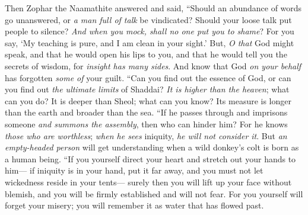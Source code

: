 \begin{biblechapter} %
 Then Zophar the Naamathite answered and said,
\verse “Should an abundance of words go unanswered, 
or \textit{a man full of talk} be vindicated?
\verse Should your loose talk put people to silence? 
\textit{And when you mock, shall no one put you to shame}?
\verse For you say, ‘My teaching is pure, 
and I am clean in your sight.’
\verse But, \textit{O that} God might speak, 
and that he would open his lips to you,
\verse and that he would tell you the secrets of wisdom, 
for \textit{insight has many sides}. 
And know that God \textit{on your behalf} has forgotten \textit{some of} your guilt.
\verse “Can you find out the essence of God, 
or can you find out \textit{the ultimate limits} of Shaddai?
\verse \textit{It is higher than the heaven}; what can you do? 
It is deeper than Sheol; what can you know?
\verse Its measure is longer than the earth 
and broader than the sea.
\verse “If he passes through and imprisons someone 
\textit{and summons the assembly}, then who can hinder him?
\verse For he knows \textit{those who are worthless}; 
\textit{when he sees} iniquity, \textit{he will not consider it}.
\verse But \textit{an empty-headed person} will get understanding 
when a wild donkey’s colt is born as a human being.
\verse “If you yourself direct your heart 
and stretch out your hands to him—
\verse if iniquity is in your hand, put it far away, 
and you must not let wickedness reside in your tents—
\verse surely then you will lift up your face without blemish, 
and you will be firmly established and will not fear.
\verse For you yourself will forget your misery; 
you will remember it as water that has flowed past.

\end{biblechapter}
